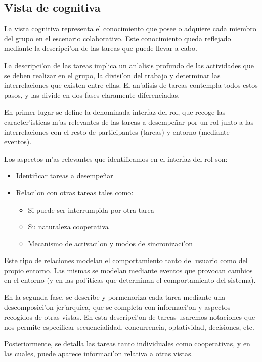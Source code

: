 \subsection{Vista de cognitiva}
La vista cognitiva representa el conocimiento que posee o adquiere cada miembro del grupo en el escenario colaborativo. Este conocimiento queda reflejado mediante la descripci'on de las tareas que puede llevar a cabo.

La descripci'on de las tareas implica un an'alisis profundo de las actividades que se deben realizar en el grupo, la divisi'on del trabajo y determinar las interrelaciones que existen entre ellas. El an'alisis de tareas contempla todos estos pasos, y las divide en dos fases claramente diferenciadas. 

En primer lugar se define la denominada interfaz del rol, que recoge las caracter'isticas m'as relevantes de las tareas a desempe\~nar por un rol junto a las interrelaciones con el resto de participantes (tareas) y entorno (mediante eventos).
 
Los aspectos m'as relevantes que identificamos en el interfaz del rol son:

\begin{itemize}
	\item Identificar tareas a desempe\~nar
	\item Relaci'on con otras tareas tales como:
	\begin{itemize} 
		\item Si puede ser interrumpida por otra tarea 
		\item Su naturaleza cooperativa 
		\item Mecanismo de activaci'on y modos de sincronizaci'on 
	\end{itemize}
\end{itemize}

\medskip

Este tipo de relaciones modelan el comportamiento tanto del usuario como del propio entorno. Las mismas se modelan mediante eventos que provocan cambios en el entorno (y en las pol'iticas que determinan el comportamiento del sistema). 

\medskip
En la segunda fase, se describe y pormenoriza cada tarea mediante una descomposici'on jer'arquica, que se completa con informaci'on y aspectos recogidos de otras vistas. En esta descripci'on de tareas usaremos notaciones que nos permite especificar secuencialidad, concurrencia, optatividad, decisiones, etc.

\medskip
Posteriormente, se detalla las tareas tanto individuales como cooperativas, y en las cuales, puede aparece informaci'on relativa a otras vistas.

